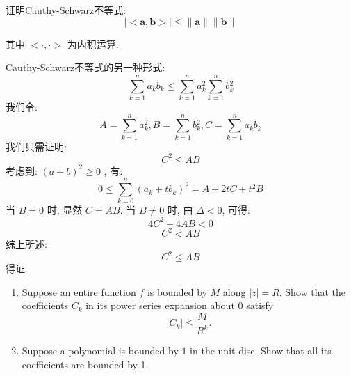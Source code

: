 \documentclass[12pt]{article}
\newenvironment{solution}[2][Solution]{\begin{trivlist}
\item[\hskip \labelsep {\bfseries #1}]}{\end{trivlist}}
\newenvironment{problem}[2][Problem]{\begin{trivlist}
\item[\hskip \labelsep {\bfseries #1}\hskip \labelsep {\bfseries #2.}]}{\end{trivlist}}
\begin{document}
\begin{problem}{1}
证明Cauthy-Schwarz不等式:
\[
\boldsymbol{\mid<a,b>\mid \leq \parallel a \parallel\parallel b \parallel}
\]

其中 $<\cdot,\cdot>$ 为内积运算.
\end{problem}

\begin{solution}{2}
Cauthy-Schwarz不等式的另一种形式:
\[
\sum_{k=1}^{n} a_kb_k \leq \sum_{k=1}^n a{_k^2} \sum_{k=1}^{n} b{_k^2}
\]
我们令:
\[
A = \sum_{k=1}^{n} a{_k^2}, 
B = \sum_{k=1}^{n} b{_k^2},
C = \sum_{k=1}^{n} a_kb_k
\]
我们只需证明:
\[
C^2 \leq AB
\]
考虑到: $(a+b)^2 \geq 0$ , 有:
\[
0 \leq \sum_{k=0}^n (a_k+tb_k)^2 = A + 2tC + t^2B
\]
当 $B = 0$ 时, 显然 $C = AB$.
当 $B \neq 0$ 时, 由 $\Delta <0$, 可得:
\[
4C^2 - 4AB < 0
\]
\[
C^2 < AB
\]
综上所述:
\[
C^2 \leq AB
\]
得证.
\end{solution}


\vspace{2cm}



\begin{problem}{2}
\begin{enumerate}[label=\alph*)]
    \item Suppose an entire function $f$ is bounded by $M$ along $|z|=R$. Show that the coefficients $C_k$ in its power series expansion about $0$ satisfy
    \[
    |C_k|\leq\frac{M}{R^k}.
    \]
    \item Suppose a polynomial is bounded by $1$ in the unit disc. Show that all its coefficients are bounded by 1.
\end{enumerate}
\end{problem}
\end{document}
